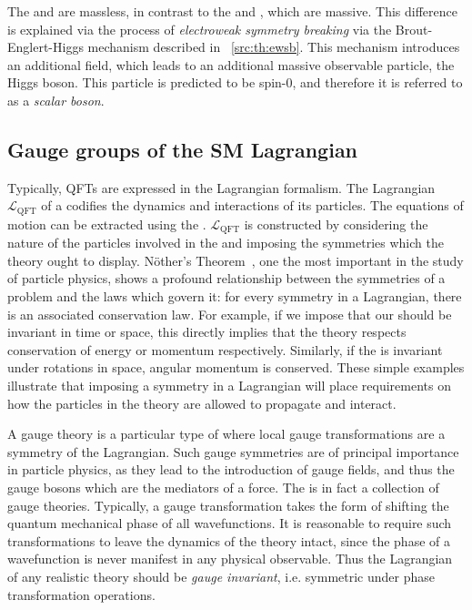 The \Pphoton and \Pgluon are massless, in contrast to the \PWmp and \PZzero, which are massive. This difference is explained via the process of \emph{electroweak symmetry breaking} via the Brout-Englert-Higgs mechanism described in \Sec~\ref{src:th:ewsb}. This mechanism introduces an additional field, which leads to an additional massive observable particle, the Higgs boson. This particle is predicted to be spin-$0$, and therefore it is referred to as a \emph{scalar boson}.

\subsection{Gauge groups of the SM Lagrangian}
\label{sec:th:gauge}

Typically, QFTs are expressed in the Lagrangian formalism. The Lagrangian $\mathcal{L}_{\text{QFT}}$ of a \QFT codifies the dynamics and interactions of its particles. The equations of motion can be extracted using the \ELE. $\mathcal{L}_{\text{QFT}}$ is constructed by considering the nature of the particles involved in the \QFT and imposing the symmetries which the theory ought to display. N\"other's Theorem~\cite{Noether}, one the most important in the study of particle physics, shows a profound relationship between the symmetries of a problem and the laws which govern it: for every symmetry in a Lagrangian, there is an associated conservation law. For example, if we impose that our \QFT should be invariant in time or space, this directly implies that the theory respects conservation of energy or momentum respectively. Similarly, if the \QFT is invariant under rotations in space, angular momentum is conserved. These simple examples illustrate that imposing a symmetry in a Lagrangian will place requirements on how the particles in the theory are allowed to propagate and interact. 

A gauge theory is a particular type of \QFT where local gauge transformations are a symmetry of the Lagrangian. Such gauge symmetries are of principal importance in particle physics, as they lead to the introduction of gauge fields, and thus the gauge bosons which are the mediators of a force. The \SM is in fact a collection of gauge theories. Typically, a gauge transformation takes the form of shifting the quantum mechanical phase of all wavefunctions. It is reasonable to require such transformations to leave the dynamics of the theory intact, since the phase of a wavefunction is never manifest in any physical observable. Thus the Lagrangian of any realistic theory should be \emph{gauge invariant}, i.e. symmetric under phase transformation operations.  

